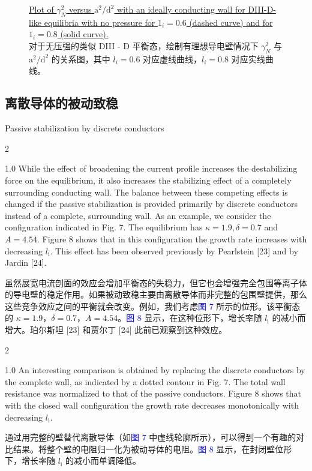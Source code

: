 \documentclass[utf8]{ctexart}
\newcommand\enzhbox[2]{
  	\quad\par \begin{paracol}{2} \colseprulecolor{black} 
  		\begin{spacing}{1.0}
  			\footnotesize  #1
  		\end{spacing}
  		\switchcolumn[1] 
  		#2
  	\end{paracol} \quad\par
  }
\begin{document}
\begin{sloppypar}
\begin{figure}[H]
 \caption{\uline{Plot of $\gamma_{N}^{2}$ versus $\mathrm{a}^{2} / \mathrm{d}^{2}$ with an ideally conducting wall for DIII-D-like equilibria with no pressure for $1_{i}=0.6$ (dashed curve) and for $1_{i}=0.8$ (solid curve).}\\对于无压强的类似 DIII - D 平衡态，绘制有理想导电壁情况下 $\gamma_{N}^{2}$ 与 $\mathrm{a}^{2} / \mathrm{d}^{2}$ 的关系图，其中 $l_{i}=0.6$ 对应虚线曲线，$l_{i}=0.8$ 对应实线曲线。 }
  	\label{fig6.}
  \end{figure}
  
   
 \subsection{离散导体的被动致稳}
 {  \small Passive stabilization by discrete conductors \par }
 
\enzhbox{  While the effect of broadening the current profile increases the destabilizing force on the equilibrium, it also increases the stabilizing effect of a completely surrounding conducting wall. The balance between these competing effects is changed if the passive stabilization is provided primarily by discrete conductors instead of a complete, surrounding wall. As an example, we consider the configuration indicated in Fig. 7. The equilibrium has $\kappa=1.9, \delta=0.7$ and $A=4.54$. Figure 8 shows that in this configuration the growth rate increases with decreasing $l_{\mathrm{i}}$. This effect has been observed previously by Pearlstein \textcolor{green!50!black}{[23]} and by Jardin \textcolor{green!50!black}{[24]}.}{
虽然展宽电流剖面的效应会增加平衡态的失稳力，但它也会增强完全包围等离子体的导电壁的稳定作用。如果被动致稳主要由离散导体而非完整的包围壁提供，那么这些竞争效应之间的平衡就会改变。例如，我们考虑\textcolor{blue}{图 7} 所示的位形。该平衡态的 $\kappa = 1.9$，$\delta = 0.7$，$A = 4.54$。\textcolor{blue}{图 8} 显示，在这种位形下，增长率随 $l_{\mathrm{i}}$ 的减小而增大。珀尔斯坦 \textcolor{green!50!black}{[23]} 和贾尔丁 \textcolor{green!50!black}{[24]} 此前已观察到这种效应。 }
  
 
\enzhbox{  An interesting comparison is obtained by replacing the discrete conductors by the complete wall, as indicated by a dotted contour in Fig. 7. The total wall resistance was normalized to that of the passive conductors. Figure 8 shows that with the closed wall configuration the growth rate decreases monotonically with decreasing $l_{\mathrm{i}}$.}{
通过用完整的壁替代离散导体（如\textcolor{blue}{图 7} 中虚线轮廓所示），可以得到一个有趣的对比结果。将整个壁的电阻归一化为被动导体的电阻。\textcolor{blue}{图 8} 显示，在封闭壁位形下，增长率随 $l_{\mathrm{i}}$ 的减小而单调降低。 }
  

\end{sloppypar}
\end{document}
